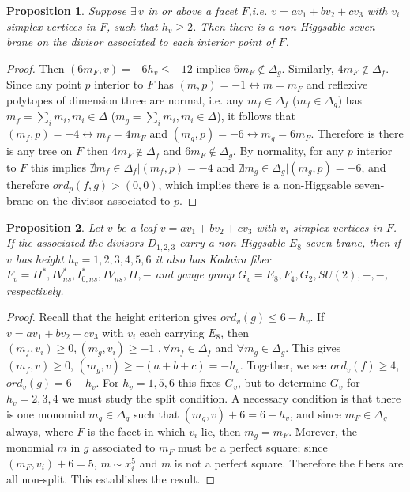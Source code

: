 \documentclass[aps,prl,twocolumn, superscriptaddress,groupedaddress,nofootinbib]{revtex4-1}
\newtheorem{prop}{Proposition}
\begin{document}
\begin{prop}
\label{prop:NH7fromsingletree}
Suppose $\exists \, v $ in or above a facet $F$,i.e. $v=av_1+bv_2+cv_3$ with $v_i$ simplex vertices in $F$, such that $h_v\geq 2$. Then there is a non-Higgsable seven-brane on the divisor associated
to each interior point of $F$.
\end{prop}

\begin{proof}
Then $(6 m_F,v)=-6h_v \leq -12$ implies $6m_F \notin \Delta_g$.
Similarly, $4m_F \notin \Delta_f$. Since any point $p$ interior to $F$ has 
$(m,p)=-1 \leftrightarrow m=m_F$ and reflexive polytopes of dimension three
are normal, i.e. any $m_f\in \Delta_f$ ($m_f \in \Delta_g$) has
$m_f = \sum_i m_i, m_i\in \Delta$ ($m_g = \sum_i m_i, m_i\in \Delta$),
it follows that $(m_f,p)=-4 \leftrightarrow m_f = 4m_F$ and $(m_g,p)=-6 \leftrightarrow m_g = 6m_F$. Therefore is there is any tree on $F$
then $4m_F \notin \Delta_f$ and $6m_F\notin \Delta_g$. By normality,
for any $p$ interior to $F$ this implies
$\nexists m_f \in \Delta_f | (m_f,p)=-4$ and
$\nexists m_g \in \Delta_g | (m_g,p)=-6$, and therefore $ord_p(f,g) > (0,0)$,
which implies there is a non-Higgsable seven-brane on the divisor associated to $p$.
\end{proof}

\begin{prop}
\label{prop:E8roots}
Let $v$ be a leaf $v=av_1 + bv_2 + cv_3$ with $v_i$ simplex vertices in $F$. If
the associated the divisors $D_{1,2,3}$
carry a non-Higgsable $E_8$ seven-brane, then if $v$ has height
 $h_v=1,2,3,4,5,6$ it also has Kodaira fiber $F_v=II^*,IV^*_{ns},I^*_{0,ns},IV_{ns},II,-$
and gauge group $G_v=E_8,F_4,G_2,SU(2),-,-$, respectively.
\end{prop}
\begin{proof}
Recall that the height criterion
gives $ord_v(g)\leq 6-h_v$. If $v=av_1+bv_2+cv_3$ with $v_i$ each carrying $E_8$,
then 
$(m_f,v_i)\geq 0, (m_g,v_i)\geq -1\,\,, \forall m_f\in \Delta_f 
$ and $\forall m_g\in \Delta_g$.
This gives $(m_f,v)\geq 0$, $(m_g,v)\geq-(a+b+c)= -h_v$. Together, we see
$ord_v(f)\geq 4$, $ord_v(g)=6-h_v$. For $h_v= 1,5,6$ this fixes $G_v$, but 
to determine $G_v$ for $h_v=2,3,4$ we must study the split condition. A necessary
condition is that there is one monomial $m_g\in \Delta_g$ such that $(m_g,v)+6=6-h_v$,
and since $m_F \in \Delta_g$ always, where $F$ is the facet in which $v_i$ lie,
then $m_g=m_F$. Morever, the monomial $m$ in $g$ associated to $m_F$ must be a perfect
square; since $(m_F,v_i)+6=5$, $m\sim x_i^5$ and $m$ is not a perfect square. 
Therefore the fibers are all non-split. This establishes the result.
\end{proof}
\end{document}
